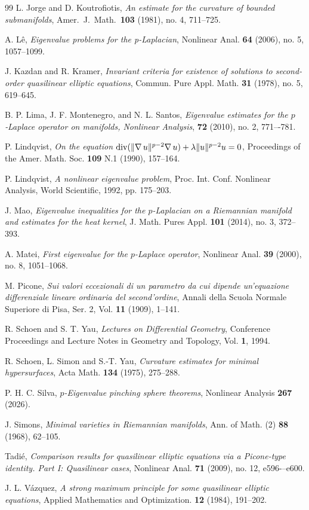 \documentclass{article}
\newcommand{\grad}{\nabla\,}
\newcommand{\diver}{{{\rm{div}}}}
\begin{document}
\begin{thebibliography}{99}
 L. Jorge and D. Koutrofiotis, \emph{An estimate for the curvature of bounded submanifolds}, Amer.\ J.\ Math.\ \textbf{103} (1981), no. 4, 711--725.

A. L\^{e}, {\em Eigenvalue problems for the 
p-Laplacian}, Nonlinear Anal. \textbf{64 } (2006), no. 5,  1057--1099.

J. Kazdan and R. Kramer, \emph{Invariant criteria for existence of solutions to second-order quasilinear elliptic equations}, Commun. Pure Appl. Math. \textbf{31} (1978), no. 5, 619--645.

 B. P. Lima, J. F. Montenegro, and N. L. Santos,
\emph{Eigenvalue estimates for the $p$‑Laplace operator on manifolds, Nonlinear Analysis}, \textbf{72} (2010), no. 2, 771–-781.


P. Lindqvist, {\em On the equation $\diver( \| \grad u \|^{p-2}\grad u )+ \lambda \| u \|^{p-2}u=0$}, Proceedings of the Amer. Math. Soc. \textbf{109} N.1 (1990), 157--164.


P. Lindqvist, \emph{A nonlinear eigenvalue problem}, Proc. Int. Conf. Nonlinear Analysis, 
World Scientific, 1992, pp. 175--203.

 J. Mao, \emph{Eigenvalue inequalities for the $p$-Laplacian on a Riemannian manifold and estimates for the heat kernel}, J. Math. Pures Appl. \textbf{101} (2014), no. 3, 372--393.

A. Matei, {\em First eigenvalue for the  $p$-Laplace operator}, Nonlinear Anal. \textbf{39} (2000), no. 8, 1051--1068.

 M. Picone, {\em Sui valori eccezionali di un parametro da cui dipende un'equazione differenziale lineare ordinaria del second'ordine}, Annali della Scuola Normale Superiore di Pisa, Ser. 2, Vol. \textbf{11} (1909), 1--141.

 R. Schoen and S. T. Yau, \emph{Lectures on Differential Geometry}, Conference Proceedings and Lecture Notes in Geometry and Topology, Vol. \textbf{1}, 1994.

R. Schoen, L. Simon and S.-T. Yau, \emph{Curvature estimates for minimal hypersurfaces}, Acta Math. \textbf{134} (1975), 275--288.

 P. H. C. Silva,
\emph{$p$-Eigenvalue pinching sphere theorems}, Nonlinear Analysis \textbf{267} (2026).

 J. Simons, \emph{Minimal varieties in Riemannian manifolds},
Ann. of Math. (2) \textbf{88} (1968), 62--105.

 Tadié, \emph{Comparison results for quasilinear elliptic equations via a Picone-type identity. Part I: Quasilinear cases},  
Nonlinear Anal. \textbf{71} (2009), no. 12, e596-–e600. 

J. L. V\'azquez, \emph{A strong maximum principle for some quasilinear elliptic equations}, Applied Mathematics and Optimization. \textbf{12} (1984), 191--202.



\end{thebibliography}
\end{document}
